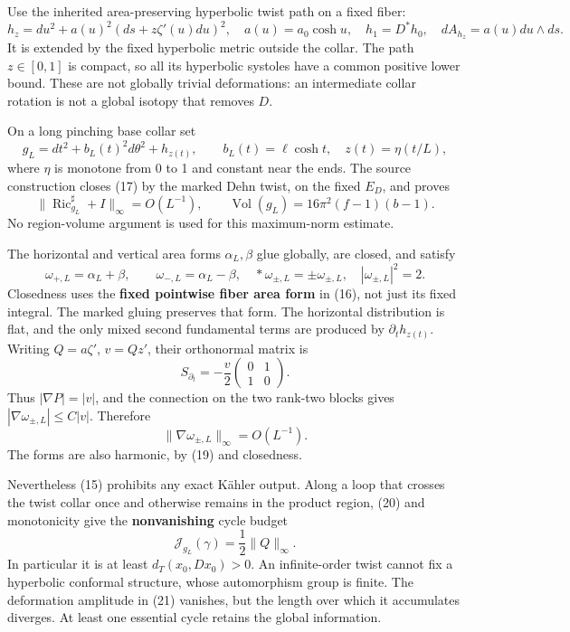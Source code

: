 \documentclass[
  11pt,
]{article}
\begin{document}
Use the inherited area-preserving hyperbolic twist path on a fixed
fiber: \[
 h_z=du^2+a(u)^2(ds+z\zeta'(u)du)^2,
 \quad a(u)=a_0\cosh u,
 \quad h_1=D^*h_0,
 \quad dA_{h_z}=a(u)du\wedge ds.
\tag{16}
\] It is extended by the fixed hyperbolic metric outside the collar. The
path \(z\in[0,1]\) is compact, so all its hyperbolic systoles have a
common positive lower bound. These are not globally trivial
deformations: an intermediate collar rotation is not a global isotopy
that removes \(D\).

On a long pinching base collar set \[
 g_L=dt^2+b_L(t)^2d\theta^2+h_{z(t)},\qquad
 b_L(t)=\ell\cosh t,\quad z(t)=\eta(t/L),
\tag{17}
\] where \(\eta\) is monotone from 0 to 1 and constant near the ends.
The source construction closes (17) by the marked Dehn twist, on the
fixed \(E_D\), and proves \[
 \|\operatorname{Ric}_{g_L}^{\sharp}+I\|_\infty=O(L^{-1}),
 \qquad \operatorname{Vol}(g_L)=16\pi^2(f-1)(b-1).
\tag{18}
\] No region-volume argument is used for this maximum-norm estimate.

The horizontal and vertical area forms \(\alpha_L,\beta\) glue globally,
are closed, and satisfy \[
 \omega_{+,L}=\alpha_L+\beta,\qquad
 \omega_{-,L}=\alpha_L-\beta,
 \quad *\omega_{\pm,L}=\pm\omega_{\pm,L},
 \quad |\omega_{\pm,L}|^2=2.
\tag{19}
\] Closedness uses the \textbf{fixed pointwise fiber area form} in (16),
not just its fixed integral. The marked gluing preserves that form. The
horizontal distribution is flat, and the only mixed second fundamental
terms are produced by \(\partial_th_{z(t)}\). Writing \(Q=a\zeta'\),
\(v=Qz'\), their orthonormal matrix is \[
                   S_{\partial_t}
                    =-\frac v2\begin{pmatrix}0&1\\1&0\end{pmatrix}.
\tag{20}
\] Thus \(|\nabla P|=|v|\), and the connection on the two rank-two
blocks gives \(|\nabla\omega_{\pm,L}|\le C|v|\). Therefore \[
                 \|\nabla\omega_{\pm,L}\|_\infty=O(L^{-1}).
\tag{21}
\] The forms are also harmonic, by (19) and closedness.

Nevertheless (15) prohibits any exact Kähler output. Along a loop that
crosses the twist collar once and otherwise remains in the product
region, (20) and monotonicity give the \textbf{nonvanishing} cycle
budget \[
                  \mathcal J_{g_L}(\gamma)
                             =\frac12\|Q\|_\infty.
\tag{22}
\] In particular it is at least \(d_T(x_0,Dx_0)>0\). An infinite-order
twist cannot fix a hyperbolic conformal structure, whose automorphism
group is finite. The deformation amplitude in (21) vanishes, but the
length over which it accumulates diverges. At least one essential cycle
retains the global information.
\end{document}
